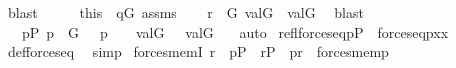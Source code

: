 \begin{isabellebody}
\ blast\isanewline
\ \ \isamarkupfalse%
\ \isamarkupfalse%
\ this\ \ {\isacartoucheopen}q{\isasymin}G{\isacartoucheclose}\ assms\isanewline
\ \ \isamarkupfalse%
\ {\isachardoublequoteopen}r\ {\isasymin}\ G{\isachardoublequoteclose}\ {\isachardoublequoteopen}val{\isacharparenleft}{\kern0pt}G{\isacharcomma}{\kern0pt}{\isasympi}{\isacharparenright}{\kern0pt}\ {\isacharequal}{\kern0pt}\ val{\isacharparenleft}{\kern0pt}G{\isacharcomma}{\kern0pt}{\isasymsigma}{\isacharparenright}{\kern0pt}{\isachardoublequoteclose}\ \isamarkupfalse%
\ blast{\isacharplus}{\kern0pt}\isanewline
\ \ \isamarkupfalse%
\isanewline
\ \ \isamarkupfalse%
\ {\isachardoublequoteopen}{\isasymexists}\ {\isasymsigma}{\isachardot}{\kern0pt}\ {\isasymexists}p{\isasymin}P{\isachardot}{\kern0pt}\ p\ {\isasymin}\ G\ {\isasymand}\ {\isasymlangle}{\isasymsigma}{\isacharcomma}{\kern0pt}\ p{\isasymrangle}\ {\isasymin}\ {\isasymtau}\ {\isasymand}\ val{\isacharparenleft}{\kern0pt}G{\isacharcomma}{\kern0pt}\ {\isasymsigma}{\isacharparenright}{\kern0pt}\ {\isacharequal}{\kern0pt}\ val{\isacharparenleft}{\kern0pt}G{\isacharcomma}{\kern0pt}\ {\isasympi}{\isacharparenright}{\kern0pt}{\isachardoublequoteclose}\ \isamarkupfalse%
\ auto\isanewline
{}\isamarkupfalse%
%
\endisatagproof
{\isafoldproof}%
%
\isadelimproof
\isanewline
%
\endisadelimproof
\isanewline
\isanewline
{}\isamarkupfalse%
\ refl{\isacharunderscore}{\kern0pt}forces{\isacharunderscore}{\kern0pt}eq{\isacharcolon}{\kern0pt}{\isachardoublequoteopen}p{\isasymin}P\ {\isasymLongrightarrow}\ forces{\isacharunderscore}{\kern0pt}eq{\isacharparenleft}{\kern0pt}p{\isacharcomma}{\kern0pt}x{\isacharcomma}{\kern0pt}x{\isacharparenright}{\kern0pt}{\isachardoublequoteclose}\isanewline
%
\isadelimproof
\ \ %
\endisadelimproof
%
\isatagproof
{}\isamarkupfalse%
\ def{\isacharunderscore}{\kern0pt}forces{\isacharunderscore}{\kern0pt}eq\ \isamarkupfalse%
\ simp%
\endisatagproof
{\isafoldproof}%
%
\isadelimproof
\isanewline
%
\endisadelimproof
\isanewline
{}\isamarkupfalse%
\ forces{\isacharunderscore}{\kern0pt}memI{\isacharcolon}{\kern0pt}\ {\isachardoublequoteopen}{\isasymlangle}{\isasymsigma}{\isacharcomma}{\kern0pt}r{\isasymrangle}{\isasymin}{\isasymtau}\ {\isasymLongrightarrow}\ p{\isasymin}P\ {\isasymLongrightarrow}\ r{\isasymin}P\ {\isasymLongrightarrow}\ p{\isasympreceq}r\ {\isasymLongrightarrow}\ forces{\isacharunderscore}{\kern0pt}mem{\isacharparenleft}{\kern0pt}p{\isacharcomma}{\kern0pt}{\isasymsigma}{\isacharcomma}{\kern0pt}{\isasymtau}{\isacharparenright}{\kern0pt}{\isachardoublequoteclose}\isanewline

\end{isabellebody}
